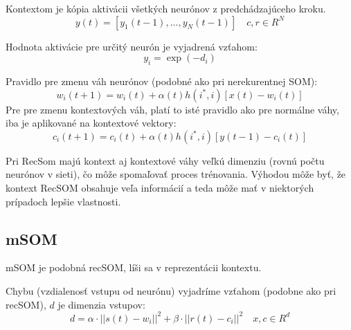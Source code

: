Kontextom je kópia aktivácii všetkých neurónov z predchádzajúceho kroku.
\begin{equation}
	y(t) = [y_1(t-1), ..., y_{N}(t-1)]  \quad c, r \in R^{N}
\end{equation}

Hodnota aktivácie pre určitý neurón je vyjadrená vzťahom:
\begin{equation}
	y_i = \exp(-d_i)
\end{equation}

Pravidlo pre zmenu váh neurónov (podobné ako pri nerekurentnej SOM):
\begin{equation}
	w_i(t + 1) = w_i(t) + \alpha(t)h(i^*, i)[x(t) - w_i(t)]
\end{equation}
Pre pre zmenu kontextových váh, platí to isté pravidlo ako pre normálne váhy, iba je aplikované 
na kontextové vektory:
\begin{equation}
	c_i(t + 1) = c_i(t) + \alpha(t)h(i^*, i)[y(t - 1) - c_i(t)]
\end{equation}

Pri RecSom majú kontext aj kontextové váhy veľkú dimenziu (rovnú počtu neurónov v sieti), čo môže spomaľovať
proces trénovania.
Výhodou môže byť, že kontext RecSOM obsahuje veľa informácií a teda môže mať v niektorých prípadoch
lepšie vlastnosti. 


\subsection{mSOM}
mSOM je podobná recSOM, líši sa v reprezentácii kontextu. \cite{DBLP:journals/ijon/StrickertH05}

Chybu (vzdialenosť vstupu od neurónu) vyjadríme vzťahom (podobne ako pri recSOM), 
$d$ je dimenzia vstupov:
\begin{equation}
	d = \alpha \cdot ||s(t) - w_i||^{2} + \beta \cdot ||r(t) - c_i||^{2} \quad x, c \in R^{d}
\end{equation}

